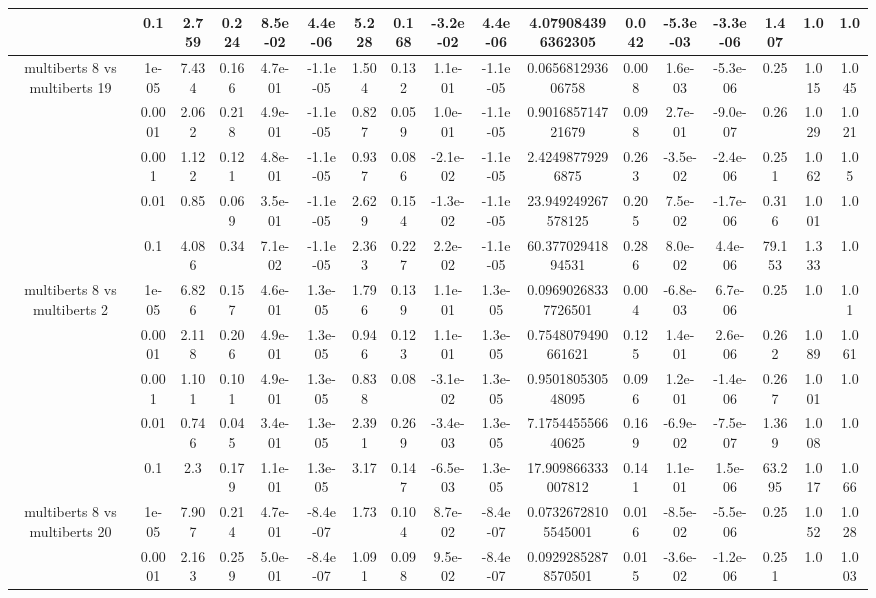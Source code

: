 \begin{tabular}{|c|c|c|c|c|c|c|c|c|c|c|c|c|c|c|c|c|}
 & 0.1 & 2.759 & 0.224 & 8.5e-02 & 4.4e-06 & 5.228 & 0.168 & -3.2e-02 & 4.4e-06 & 4.079084396362305 & 0.042 & -5.3e-03 & -3.3e-06 & 1.407 & 1.0 & 1.0 \\
\hline
\multirow{5}{*}{multiberts 8 vs multiberts 19} & 1e-05 & 7.434 & 0.166 & 4.7e-01 & -1.1e-05 & 1.504 & 0.132 & 1.1e-01 & -1.1e-05 & 0.065681293606758 & 0.008 & 1.6e-03 & -5.3e-06 & 0.25 & 1.015 & 1.045 \\
 & 0.0001 & 2.062 & 0.218 & 4.9e-01 & -1.1e-05 & 0.827 & 0.059 & 1.0e-01 & -1.1e-05 & 0.901685714721679 & 0.098 & 2.7e-01 & -9.0e-07 & 0.26 & 1.029 & 1.021 \\
 & 0.001 & 1.122 & 0.121 & 4.8e-01 & -1.1e-05 & 0.937 & 0.086 & -2.1e-02 & -1.1e-05 & 2.42498779296875 & 0.263 & -3.5e-02 & -2.4e-06 & 0.251 & 1.062 & 1.05 \\
 & 0.01 & 0.85 & 0.069 & 3.5e-01 & -1.1e-05 & 2.629 & 0.154 & -1.3e-02 & -1.1e-05 & 23.949249267578125 & 0.205 & 7.5e-02 & -1.7e-06 & 0.316 & 1.001 & 1.0 \\
 & 0.1 & 4.086 & 0.34 & 7.1e-02 & -1.1e-05 & 2.363 & 0.227 & 2.2e-02 & -1.1e-05 & 60.37702941894531 & 0.286 & 8.0e-02 & 4.4e-06 & 79.153 & 1.333 & 1.0 \\
\hline
\multirow{5}{*}{multiberts 8 vs multiberts 2} & 1e-05 & 6.826 & 0.157 & 4.6e-01 & 1.3e-05 & 1.796 & 0.139 & 1.1e-01 & 1.3e-05 & 0.09690268337726501 & 0.004 & -6.8e-03 & 6.7e-06 & 0.25 & 1.0 & 1.01 \\
 & 0.0001 & 2.118 & 0.206 & 4.9e-01 & 1.3e-05 & 0.946 & 0.123 & 1.1e-01 & 1.3e-05 & 0.7548079490661621 & 0.125 & 1.4e-01 & 2.6e-06 & 0.262 & 1.089 & 1.061 \\
 & 0.001 & 1.101 & 0.101 & 4.9e-01 & 1.3e-05 & 0.838 & 0.08 & -3.1e-02 & 1.3e-05 & 0.950180530548095 & 0.096 & 1.2e-01 & -1.4e-06 & 0.267 & 1.001 & 1.0 \\
 & 0.01 & 0.746 & 0.045 & 3.4e-01 & 1.3e-05 & 2.391 & 0.269 & -3.4e-03 & 1.3e-05 & 7.175445556640625 & 0.169 & -6.9e-02 & -7.5e-07 & 1.369 & 1.008 & 1.0 \\
 & 0.1 & 2.3 & 0.179 & 1.1e-01 & 1.3e-05 & 3.17 & 0.147 & -6.5e-03 & 1.3e-05 & 17.909866333007812 & 0.141 & 1.1e-01 & 1.5e-06 & 63.295 & 1.017 & 1.066 \\
\hline
\multirow{5}{*}{multiberts 8 vs multiberts 20} & 1e-05 & 7.907 & 0.214 & 4.7e-01 & -8.4e-07 & 1.73 & 0.104 & 8.7e-02 & -8.4e-07 & 0.07326728105545001 & 0.016 & -8.5e-02 & -5.5e-06 & 0.25 & 1.052 & 1.028 \\
 & 0.0001 & 2.163 & 0.259 & 5.0e-01 & -8.4e-07 & 1.091 & 0.098 & 9.5e-02 & -8.4e-07 & 0.09292852878570501 & 0.015 & -3.6e-02 & -1.2e-06 & 0.251 & 1.0 & 1.003 \\

\end{tabular}
